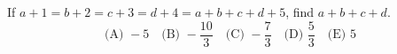 If $a+1=b+2=c+3=d+4=a+b+c+d+5$, find $a+b+c+d$.
\[
\text{(A) }-5\quad\text{(B) }-\dfrac{10}{3}\quad
\text{(C) }-\dfrac{7}{3}\quad\text{(D) }\dfrac{5}{3}\quad\text{(E) }5
\]
